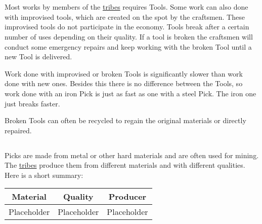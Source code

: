 \section{}\label{ch:Goods:Tools}

Most works by members of the \hyperref[ch:Tribes]{tribes} requires
\glspl{Tool}. Some work can also done with improvised tools, which are created
on the spot by the craftsmen. These improvised tools do not participate in the
economy. \Glspl{Tool} break after a certain number of uses depending on their
quality. If a tool is broken the craftsmen will conduct some emergency repairs
and keep working with the broken \gls{Tool} until a new \gls{Tool} is
delivered.

Work done with improvised or broken \glspl{Tool} is significantly slower than
work done with new ones. Besides this there is no difference between the
\glspl{Tool}, so work done with an iron \gls{Pick} is just as fast as one with
a steel \gls{Pick}. The iron one just breaks faster.

Broken \glspl{Tool} can often be recycled to regain the original materials or
directly repaired.

\subsection{}

\Glspl{Pick} are made from metal or other hard materials and are often used for mining.
The \hyperref[ch:Tribes]{tribes} produce them from different materials and with different 
qualities.
Here is a short summary:

\begin{longtable}{ccc}
	\toprule
	Material    & Quality     & Producer    \\
	\midrule
	Placeholder & Placeholder & Placeholder \\
	\bottomrule
\end{longtable}
